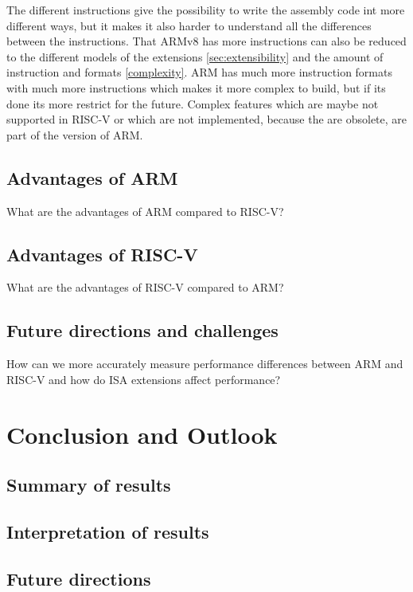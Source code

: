 \documentclass[conference]{IEEEtran}
\begin{document}
	The different instructions give the possibility to write the assembly code int more different ways, but it makes it also harder to understand all the differences between the instructions. That ARMv8 has more instructions can also be reduced to the different models of the extensions \ref{sec:extensibility} and the amount of instruction and formats \ref{complexity}.
ARM has much more instruction formats with much more instructions which makes it more complex to build, but if its done its more restrict for the future. Complex features which are maybe not supported in RISC-V or which are not implemented, because the are obsolete, are part of the version of ARM. \cite{Waterman2017} \cite{Arm2020}
	
	\subsection{Advantages of ARM}
	What are the advantages of ARM compared to RISC-V?
	\subsection{Advantages of RISC-V}
	What are the advantages of RISC-V compared to ARM?
	\subsection{Future directions and challenges}
	How can we more accurately measure performance differences between ARM and RISC-V and how do ISA extensions affect performance?

\section{Conclusion and Outlook}
\label{ref:conclusion}
	\subsection{Summary of results}
	\subsection{Interpretation of results}
	\subsection{Future directions}
\end{document}
